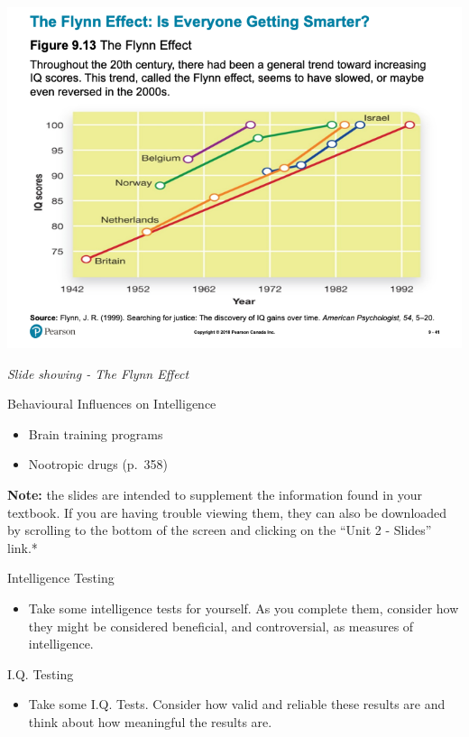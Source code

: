 \documentclass[
]{book}
\providecommand{\tightlist}{%
  \setlength{\itemsep}{0pt}\setlength{\parskip}{0pt}}
\begin{document}
\begin{reflect}
\includegraphics{assets/unit_2/slide_41.png}

\emph{Slide showing - The Flynn Effect}

Behavioural Influences on Intelligence

\begin{itemize}
\tightlist
\item
  Brain training programs\\
\item
  Nootropic drugs (p.~358)
\end{itemize}

\textbf{Note:} the slides are intended to supplement the information found in your textbook. If you are having trouble viewing them, they can also be downloaded by scrolling to the bottom of the screen and clicking on the ``Unit 2 - Slides'' link.*

{Intelligence Testing}

\begin{itemize}
\tightlist
\item
  Take some intelligence tests for yourself. As you complete them, consider how they might be considered beneficial, and controversial, as measures of intelligence.
\end{itemize}

{I.Q. Testing}

\begin{itemize}
\tightlist
\item
  Take some I.Q. Tests. Consider how valid and reliable these results are and think about how meaningful the results are.
\end{itemize}


\end{reflect}
\end{document}
